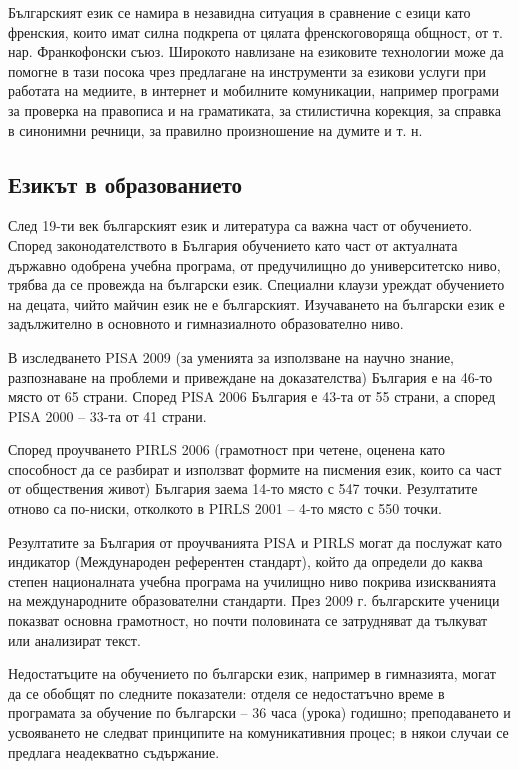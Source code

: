 \begin{multicols}{2}
  Българският език се намира в незавидна ситуация в
   сравнение с езици като френския, които имат силна подкрепа от цялата френскоговоряща общност, от т. нар.
   Франкофонски съюз. Широкото навлизане на езиковите
   технологии може да помогне в тази посока
   чрез предлагане на инструменти за езикови услуги при
   работата на медиите, в интернет и мобилните комуникации, например програми за проверка на правописа
   и на граматиката, за стилистична корекция,
  за справка в синонимни
   речници, за правилно произношение на думите и т. н.

  \subsection{Езикът в образованието}

  След 19-ти век българският език и литература са важна част
   от обучението. Според законодателството в България
   обучението като част от актуалната държавно одобрена
   учебна програма, от предучилищно до университетско
   ниво, трябва да се провежда на български език.
   Специални клаузи уреждат обучението на децата, чийто
   майчин език не е българският. Изучаването на
   български език е задължително в основното и
   гимназиалното образователно ниво.

  В изследването PISA 2009 \cite{oecd} (за уменията за използване на
   научно знание, разпознаване на проблеми и привеждане
   на доказателства) България е на 46-то място от 65 страни.
   Според PISA 2006 България е 43-та от 55 страни, а според
   PISA 2000 – 33-та от 41 страни.

  Според проучването PIRLS 2006 \cite{nces} (грамотност при четене, оценена като способност да се разбират и използват формите на писмения език, които са част от обществения живот) България заема 14-то място с 547 точки. Резултатите отново са по-ниски, отколкото в PIRLS 2001 – 4-то място с 550 точки.

  Резултатите за България от проучванията PISA и PIRLS могат да послужат като индикатор (Международен референтен стандарт), който да определи до каква степен
   националната учебна програма на училищно ниво
   покрива
   изискванията
   на
   международните образователни стандарти. През 2009 г. българските ученици показват основна грамотност, но почти половината се затрудняват да тълкуват или анализират
   текст.

  Недостатъците на обучението по български език, например в гимназията, могат да се обобщят по следните
   показатели: отделя се недостатъчно време в програмата
   за обучение по български – 36 часа (урока) годишно;
   преподаването и усвояването не следват принципите на
   комуникативния процес; в някои случаи се предлага неадекватно
   съдържание.


\end{multicols}

